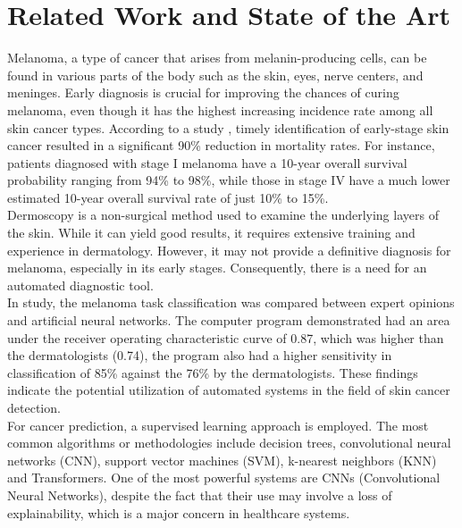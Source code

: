 \chapter{Related Work and State of the Art}
\label{cap:estat}

Melanoma, a type of cancer that arises from melanin-producing cells, can be
found in various parts of the body such as the skin, eyes, nerve centers, and
meninges. Early diagnosis is crucial for improving the chances of curing
melanoma, even though it has the highest increasing incidence rate among all
skin cancer types. According to a study \cite{TimelyMelanomaDetection}, timely
identification of early-stage skin cancer resulted in a significant 90\%
reduction in mortality rates. For instance, patients diagnosed with stage I
melanoma have a 10-year overall survival probability ranging from 94\% to 98\%,
while those in stage IV have a much lower estimated 10-year overall survival
rate of just 10\% to 15\%. \\

Dermoscopy is a non-surgical method used to examine the underlying layers of
the skin. While it can yield good results, it requires extensive training and
experience in dermatology. However, it may not provide a definitive diagnosis
for melanoma, especially in its early stages. Consequently, there is a need for
an automated diagnostic tool. \\

In \cite{EpidemiologySkinCancer} study, the melanoma task classification was
compared between expert opinions and artificial neural networks. The computer
program demonstrated had an area under the receiver operating characteristic
curve of 0.87, which was higher than the dermatologists (0.74), the program
also had a higher sensitivity in classification of 85\% against the 76\% by the
dermatologists. These findings indicate the potential utilization of automated
systems in the field of skin cancer detection. \\

For cancer prediction, a supervised learning approach is employed. The most
common algorithms or methodologies include decision trees, convolutional neural
networks (CNN), support vector machines (SVM), k-nearest neighbors (KNN) and
Transformers. One of the most powerful systems are CNNs (Convolutional Neural
Networks), despite the fact that their use may involve a loss of
explainability, which is a major concern in healthcare systems. \\


